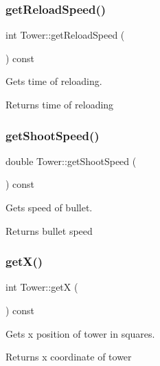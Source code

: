 \subsubsection{\texorpdfstring{get\+Reload\+Speed()}{getReloadSpeed()}}
{\footnotesize\ttfamily int Tower\+::get\+Reload\+Speed (\begin{DoxyParamCaption}{ }\end{DoxyParamCaption}) const}



Gets time of reloading. 

\begin{DoxyReturn}{Returns}
time of reloading 
\end{DoxyReturn}
\mbox{\label{class_tower_a3e24b34760dbcc22a98cb0526ff85ad9}} 
\subsubsection{\texorpdfstring{get\+Shoot\+Speed()}{getShootSpeed()}}
{\footnotesize\ttfamily double Tower\+::get\+Shoot\+Speed (\begin{DoxyParamCaption}{ }\end{DoxyParamCaption}) const}



Gets speed of bullet. 

\begin{DoxyReturn}{Returns}
bullet speed 
\end{DoxyReturn}
\mbox{\label{class_tower_ac5c9e76603f3ae1290b86796578ed69f}} 
\subsubsection{\texorpdfstring{get\+X()}{getX()}}
{\footnotesize\ttfamily int Tower\+::getX (\begin{DoxyParamCaption}{ }\end{DoxyParamCaption}) const}



Gets x position of tower in squares. 

\begin{DoxyReturn}{Returns}
x coordinate of tower 
\end{DoxyReturn}
\mbox{\label{class_tower_a8efdcbaa1b0dc9866eb753ba3871c533}} 
